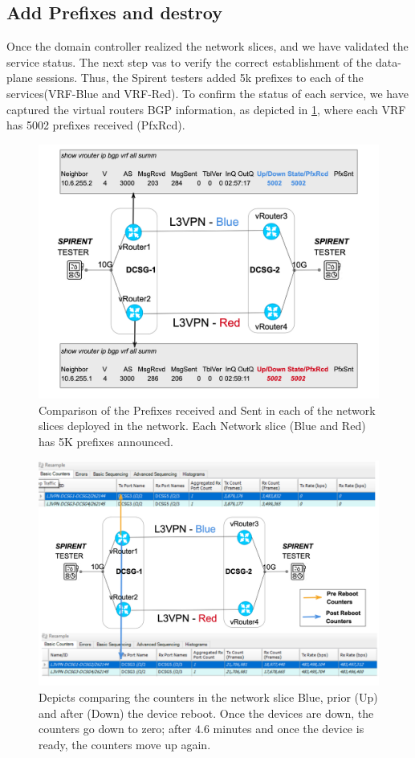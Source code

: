 \documentclass[journal,article,submit,moreauthors,pdftex]{Definitions/mdpi}
\begin{document}
\subsection{Add Prefixes and destroy}

Once the domain controller realized the network slices, and we have validated the service status. The next step vas to verify the correct establishment of the data-plane sessions. Thus, the Spirent testers added 5k prefixes to each of the services(VRF-Blue and VRF-Red). To confirm the status of each service, we have captured the virtual routers BGP information, as depicted in \cref{fig:sliceresults}, where each VRF has 5002 prefixes received (PfxRcd). 

\begin{figure}[htb]
\includegraphics[width=\linewidth]{Figs/sliceresults.png}
\caption{Comparison of the Prefixes received and Sent in each of the network slices deployed in the network. Each Network slice (Blue and Red) has 5K prefixes announced.}
\label{fig:sliceresults}
\end{figure}

\begin{figure}[htb]
\includegraphics[width=\linewidth]{Figs/sliceresults2.png}
\caption{Depicts comparing the counters in the network slice Blue,  prior (Up) and after (Down) the device reboot. Once the devices are down, the counters go down to zero; after $4.6$ minutes and once the device is ready, the counters move up again. }
\label{fig:sliceresults2}
\end{figure}
\end{document}
